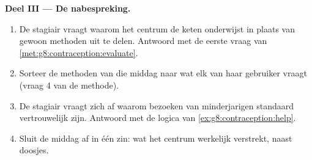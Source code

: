 \begin{problem}
\medskip\noindent\textbf{Deel III --- De nabespreking.}
\begin{enumerate}[resume]
  \item De stagiair vraagt waarom het centrum de keten onderwijst in
        plaats van gewoon methoden uit te delen. Antwoord met de eerste
        vraag van \cref{met:g8:contraception:evaluate}.
  \item Sorteer de methoden van die middag naar wat elk van haar gebruiker
        vraagt (vraag 4 van de methode).
  \item De stagiair vraagt zich af waarom bezoeken van minderjarigen
        standaard vertrouwelijk zijn. Antwoord met de logica van
        \cref{ex:g8:contraception:help}.
  \item Sluit de middag af in één zin: wat het centrum werkelijk
        verstrekt, naast doosjes.
\end{enumerate}
\end{problem}
